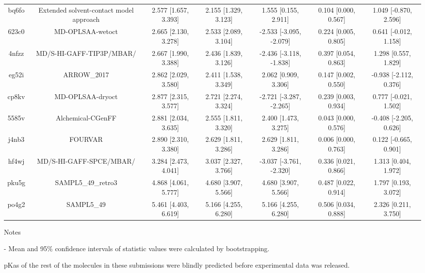 \documentclass{article}
\begin{document}
\begin{center}
\begin{longtable}{|ccccccc|}
 bq6fo &            Extended solvent-contact model approach &  2.577 [1.657, 3.393] &  2.155 [1.329, 3.123] &     1.555 [0.155, 2.911] &  0.104 [0.000, 0.567] &   1.049 [-0.870, 2.596] \\
 623c0 &                                   MD-OPLSAA-wetoct &  2.665 [2.130, 3.278] &  2.533 [2.089, 3.104] &  -2.533 [-3.095, -2.079] &  0.224 [0.005, 0.805] &   0.641 [-0.012, 1.158] \\
 4nfzz &                           MD/S-HI-GAFF-TIP3P/MBAR/ &  2.667 [1.990, 3.388] &  2.436 [1.839, 3.126] &  -2.436 [-3.118, -1.838] &  0.397 [0.054, 0.863] &    1.298 [0.557, 1.829] \\
 eg52i &                                        ARROW\_2017 &  2.862 [2.029, 3.580] &  2.411 [1.538, 3.349] &     2.062 [0.909, 3.306] &  0.147 [0.002, 0.550] &  -0.938 [-2.112, 0.376] \\
 cp8kv &                                   MD-OPLSAA-dryoct &  2.877 [2.315, 3.577] &  2.721 [2.274, 3.324] &  -2.721 [-3.287, -2.265] &  0.239 [0.003, 0.934] &   0.777 [-0.021, 1.502] \\
 5585v &                                  Alchemical-CGenFF &  2.881 [2.034, 3.635] &  2.555 [1.811, 3.320] &     2.400 [1.473, 3.275] &  0.043 [0.000, 0.576] &  -0.408 [-2.205, 0.626] \\
 j4nb3 &                                            FOURVAR &  2.890 [2.310, 3.380] &  2.629 [1.811, 3.286] &     2.629 [1.811, 3.286] &  0.006 [0.000, 0.763] &   0.122 [-0.665, 0.901] \\
 hf4wj &                            MD/S-HI-GAFF-SPCE/MBAR/ &  3.284 [2.473, 4.041] &  3.037 [2.327, 3.766] &  -3.037 [-3.761, -2.320] &  0.336 [0.021, 0.866] &    1.313 [0.404, 1.972] \\
 pku5g &                                 SAMPL5\_49\_retro3 &  4.868 [4.061, 5.777] &  4.680 [3.907, 5.566] &     4.680 [3.907, 5.566] &  0.487 [0.022, 0.914] &    1.797 [0.193, 3.072] \\
 po4g2 &                                         SAMPL5\_49 &  5.461 [4.403, 6.619] &  5.166 [4.255, 6.280] &     5.166 [4.255, 6.280] &  0.506 [0.034, 0.888] &    2.326 [0.211, 3.750] \\
\end{longtable}
\end{center}

Notes

- Mean and 95\% confidence intervals of statistic values were calculated by bootstrapping.

pKas of the rest of the molecules in these submissions were blindly predicted before experimental data was released.
\end{document}
